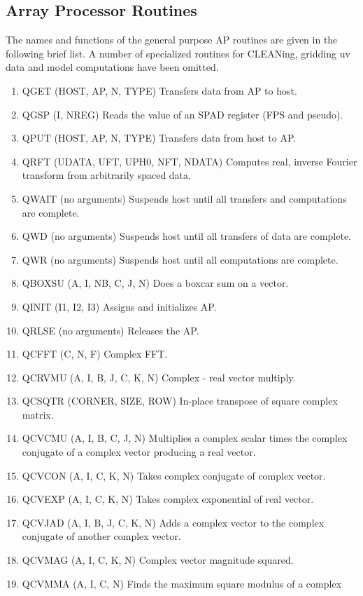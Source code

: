 \subsection{Array Processor Routines }
The names and functions of the general purpose AP routines are given
in the following brief list. A number of specialized routines for
CLEANing, gridding uv data and model computations have been omitted.
\begin{enumerate} %
\item QGET (HOST, AP, N, TYPE)  Transfers data from AP to host.
\item QGSP (I, NREG) Reads the value of an SPAD register (FPS and pseudo).
\item QPUT (HOST, AP, N, TYPE) Transfers data from host to AP.
\item QRFT (UDATA, UFT, UPH0, NFT, NDATA) Computes real, inverse Fourier
transform from arbitrarily spaced data.
\item QWAIT (no arguments) Suspends host until all transfers and
computations are complete.
\item QWD (no arguments) Suspends host until all transfers of data are
complete.
\item QWR (no arguments) Suspends host until all computations are complete.
\item QBOXSU  (A, I, NB, C, J, N) Does a boxcar sum on a vector.
\item QINIT  (I1, I2, I3) Assigns and initializes AP.
\item QRLSE (no arguments) Releases the AP.
\item QCFFT  (C, N, F) Complex FFT.
\item QCRVMU (A, I, B, J, C, K, N) Complex - real vector multiply.
\item QCSQTR (CORNER, SIZE, ROW) In-place transpose of square complex
matrix.
\item QCVCMU (A, I, B, C, J, N) Multiplies a complex scalar times the complex
conjugate of a complex vector producing a real vector.
\item QCVCON (A, I, C, K, N) Takes complex conjugate of complex vector.
\item QCVEXP (A, I, C, K, N) Takes complex exponential of real vector.
\item QCVJAD (A, I, B, J, C, K, N) Adds a complex vector to the complex
conjugate of another complex vector.
\item QCVMAG  (A, I, C, K, N) Complex vector magnitude squared.
\item QCVMMA  (A, I, C, N) Finds the maximum square modulus of a complex

\end{enumerate}
